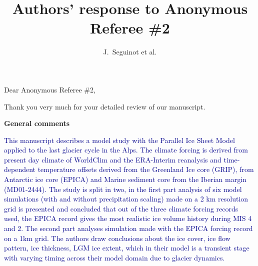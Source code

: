 

\title{Authors' response to Anonymous Referee \#2}
\author{J.~Seguinot et al.}


\maketitle
\bigskip


\newcommand{\sechead}[1]{\bigskip\noindent\textbf{#1}}
\newcommand{\referee}[1]{\bigskip\noindent\textcolor{darkblue}{#1}}
\newcommand{\msquote}[1]{\begin{quote}\textit{#1}\end{quote}}
\newcommand{\doi}[1]{doi:\allowbreak\href{http://dx.doi.org/#1}{#1}}

Dear Anonymous Referee \#2,

Thank you very much for your detailed review of our manuscript.



\sechead{General comments}

    \referee{%
        This manuscript describes a model study with the Parallel Ice Sheet
        Model applied to the last glacier cycle in the Alps. The climate
        forcing is derived from present day climate of WorldClim and the
        ERA-Interim reanalysis and time-dependent temperature offsets derived
        from the Greenland Ice core (GRIP), from Antarctic ice core (EPICA) and
        Marine sediment core from the Iberian margin (MD01-2444). The study is
        split in two, in the first part analysis of six model simulations (with
        and without precipitation scaling) made on a 2 km resolution grid is
        presented and concluded that out of the three climate forcing records
        used, the EPICA record gives the most realistic ice volume history
        during MIS 4 and 2. The second part analyses simulation made with the
        EPICA forcing record on a 1km grid. The authors draw conclusions about
        the ice cover, ice flow pattern, ice thickness, LGM ice extent, which
        in their model is a transient stage with varying timing across their
        model domain due to glacier dynamics.}

